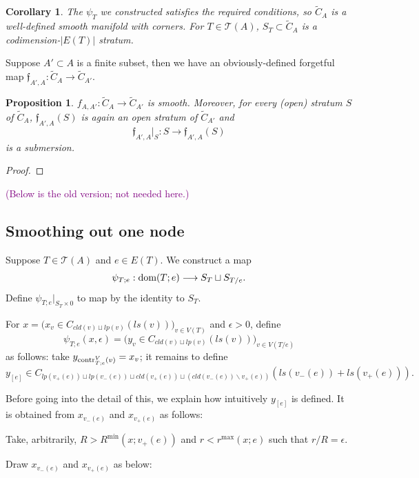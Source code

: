 \documentclass[11pt]{article}
\newtheorem{prp}[thm]{Proposition}
\newtheorem{crl}[thm]{Corollary}
\theoremstyle{definition}
\theoremstyle{remark}
\def\wt#1{\widetilde{#1}}
\def\cT{\mathcal{T}}
\def\ff{\mathfrak{f}}
\def\dom{{\tn{dom}}}
\def\cmt#1{\textcolor{purple}{(#1)}}
\def\tn#1{\textnormal{#1}}
\begin{document}
\begin{crl}
The $\psi_T$ we constructed satisfies the required conditions, so $\wt{C}_A$ is a well-defined smooth manifold with corners. For $T\in\cT(A)$, $S_T\subset \wt{C}_A$ is a codimension-$|E(T)|$ stratum. 
\end{crl}

Suppose $A'\subset A$ is a finite subset, then we have an obviously-defined forgetful map $\ff_{A',A}:\wt{C}_A\to\wt{C}_{A'}$. 

\begin{prp}
$f_{A,A'}:\wt{C}_A\to\wt{C}_{A'}$ is smooth. 
Moreover, for every (open) stratum $S$ of $\wt{C}_{A}$, $\ff_{A',A}(S)$ is again an open stratum of $\wt{C}_{A'}$ and 
$$\ff_{A',A}|_S:S\longrightarrow \ff_{A',A}(S)$$
is a submersion. 
\end{prp}

\begin{proof}

\end{proof}



\cmt{Below is the old version; not needed here.}

\subsection{Smoothing out one node}

Suppose $T\in\cT(A)$ and $e\in E(T)$. 
We construct a map 
$$\psi_{T;e}: \dom(T;e)\longrightarrow S_T\sqcup S_{T/e}.$$
Define $\psi_{T;e}|_{S_T\times 0}$ to map by the identity to $S_T$. 

For $x=\big(x_v\in C_{cld(v)\sqcup lp(v)}(ls(v))\big)_{v\in V(T)}$ and $\epsilon>0$, define 
$$\psi_{T;e}(x,\epsilon)=\big(y_v\in C_{cld(v)\sqcup lp(v)}(ls(v))\big)_{v\in V(T/e)}$$ 
as follows: 
take $y_{\tn{contr}^V_{T;e}(v)}=x_v$; it remains to define $$y_{[e]}\in C_{lp(v_+(e))\sqcup lp(v_-(e))\sqcup cld(v_+(e))\sqcup (cld(v_-(e))\backslash v_+(e))}(ls(v_-(e))+ls(v_+(e))).$$

Before going into the detail of this, we explain how intuitively $y_{[e]}$ is defined. It is obtained from $x_{v_-(e)}$ and $x_{v_+(e)}$ as follows: 

Take, arbitrarily, $R>R^{\min}(x;v_+(e))$ and $r<r^{\max}(x;e)$ such that $r/R=\epsilon$. 

Draw $x_{v_-(e)}$ and $x_{v_+(e)}$ as below: 
\end{document}
